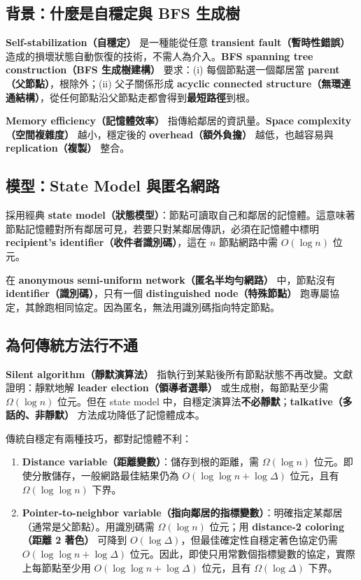 \documentclass[a4paper, 12pt]{article}
\begin{document}
\subsection{背景：什麼是自穩定與 BFS 生成樹}
\label{subsec:intro-background}

\textbf{Self-stabilization（自穩定）} 是一種能從任意 \textbf{transient fault（暫時性錯誤）} 造成的損壞狀態自動恢復的技術，不需人為介入。\textbf{BFS spanning tree construction（BFS 生成樹建構）} 要求：(i) 每個節點選一個鄰居當 \textbf{parent（父節點）}，根除外；(ii) 父子關係形成 \textbf{acyclic connected structure（無環連通結構）}，從任何節點沿父節點走都會得到\textbf{最短路徑}到根。

\textbf{Memory efficiency（記憶體效率）} 指傳給鄰居的資訊量。\textbf{Space complexity（空間複雜度）} 越小，穩定後的 \textbf{overhead（額外負擔）} 越低，也越容易與 \textbf{replication（複製）} 整合。

\subsection{模型：State Model 與匿名網路}
\label{subsec:intro-model}

採用經典 \textbf{state model（狀態模型）}：節點可讀取自己和鄰居的記憶體。這意味著節點記憶體對所有鄰居可見，若要只對某鄰居傳訊，必須在記憶體中標明 \textbf{recipient's identifier（收件者識別碼）}，這在 $n$ 節點網路中需 $O(\log n)$ 位元。

在 \textbf{anonymous semi-uniform network（匿名半均勻網路）} 中，節點沒有 \textbf{identifier（識別碼）}，只有一個 \textbf{distinguished node（特殊節點）} 跑專屬協定，其餘跑相同協定。因為匿名，無法用識別碼指向特定節點。

\subsection{為何傳統方法行不通}
\label{subsec:intro-classical}

\textbf{Silent algorithm（靜默演算法）} 指執行到某點後所有節點狀態不再改變。文獻證明：靜默地解 \textbf{leader election（領導者選舉）} 或生成樹，每節點至少需 $\Omega(\log n)$ 位元。但在 state model 中，自穩定演算法\textbf{不必靜默}；\textbf{talkative（多話的、非靜默）} 方法成功降低了記憶體成本。

傳統自穩定有兩種技巧，都對記憶體不利：

\begin{enumerate}
    \item \textbf{Distance variable（距離變數）}：儲存到根的距離，需 $\Omega(\log n)$ 位元。即使分散儲存，一般網路最佳結果仍為 $O(\log\log n + \log\Delta)$ 位元，且有 $\Omega(\log\log n)$ 下界。
    \item \textbf{Pointer-to-neighbor variable（指向鄰居的指標變數）}：明確指定某鄰居（通常是父節點）。用識別碼需 $\Omega(\log n)$ 位元；用 \textbf{distance-2 coloring（距離 2 著色）} 可降到 $O(\log\Delta)$，但最佳確定性自穩定著色協定仍需 $O(\log\log n + \log\Delta)$ 位元。因此，即使只用常數個指標變數的協定，實際上每節點至少用 $O(\log\log n + \log\Delta)$ 位元，且有 $\Omega(\log\Delta)$ 下界。
\end{enumerate}
\end{document}
